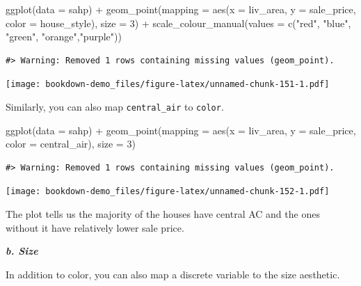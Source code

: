 \documentclass[
]{book}
\newenvironment{Shaded}{\begin{snugshade}}{\end{snugshade}}
\newcommand{\AttributeTok}[1]{\textcolor[rgb]{0.77,0.63,0.00}{#1}}
\newcommand{\DecValTok}[1]{\textcolor[rgb]{0.00,0.00,0.81}{#1}}
\newcommand{\FunctionTok}[1]{\textcolor[rgb]{0.00,0.00,0.00}{#1}}
\newcommand{\NormalTok}[1]{#1}
\newcommand{\SpecialCharTok}[1]{\textcolor[rgb]{0.00,0.00,0.00}{#1}}
\newcommand{\StringTok}[1]{\textcolor[rgb]{0.31,0.60,0.02}{#1}}
\begin{document}
\begin{Shaded}
\begin{Highlighting}[]
\FunctionTok{ggplot}\NormalTok{(}\AttributeTok{data =}\NormalTok{ sahp) }\SpecialCharTok{+} \FunctionTok{geom\_point}\NormalTok{(}\AttributeTok{mapping =} \FunctionTok{aes}\NormalTok{(}\AttributeTok{x =}\NormalTok{ liv\_area, }\AttributeTok{y =}\NormalTok{ sale\_price, }\AttributeTok{color =}\NormalTok{ house\_style), }\AttributeTok{size =} \DecValTok{3}\NormalTok{) }\SpecialCharTok{+}  \FunctionTok{scale\_colour\_manual}\NormalTok{(}\AttributeTok{values =} \FunctionTok{c}\NormalTok{(}\StringTok{"red"}\NormalTok{, }\StringTok{"blue"}\NormalTok{, }\StringTok{"green"}\NormalTok{, }\StringTok{"orange"}\NormalTok{,}\StringTok{"purple"}\NormalTok{))}
\end{Highlighting}
\end{Shaded}

\begin{verbatim}
#> Warning: Removed 1 rows containing missing values (geom_point).
\end{verbatim}

\texttt{[image: bookdown-demo\_files/figure-latex/unnamed-chunk-151-1.pdf]}

Similarly, you can also map \texttt{central\_air} to \texttt{color}.

\begin{Shaded}
\begin{Highlighting}[]
\FunctionTok{ggplot}\NormalTok{(}\AttributeTok{data =}\NormalTok{ sahp) }\SpecialCharTok{+} \FunctionTok{geom\_point}\NormalTok{(}\AttributeTok{mapping =} \FunctionTok{aes}\NormalTok{(}\AttributeTok{x =}\NormalTok{ liv\_area, }\AttributeTok{y =}\NormalTok{ sale\_price, }\AttributeTok{color =}\NormalTok{ central\_air), }\AttributeTok{size =} \DecValTok{3}\NormalTok{)}
\end{Highlighting}
\end{Shaded}

\begin{verbatim}
#> Warning: Removed 1 rows containing missing values (geom_point).
\end{verbatim}

\texttt{[image: bookdown-demo\_files/figure-latex/unnamed-chunk-152-1.pdf]}

The plot tells us the majority of the houses have central AC and the ones without it have relatively lower sale price.

\textbf{\emph{b. Size}}

In addition to color, you can also map a discrete variable to the size aesthetic.
\end{document}
